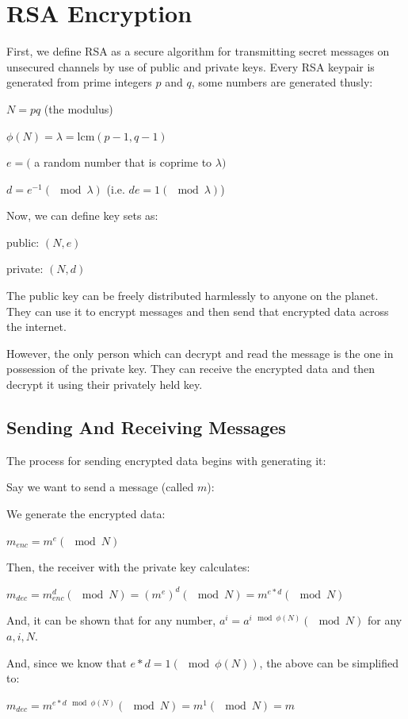 \documentclass[a4paper,11pt]{article}
\theoremstyle{mytheor}
\begin{document}
\section{RSA Encryption}\label{sec:rsa}

\cite{PCS} First, we define RSA as a secure algorithm for transmitting secret messages on unsecured channels by use of public and private keys. Every RSA keypair is generated from prime integers $p$ and $q$, some numbers are generated thusly:

$N=pq$ (the modulus)

$\phi(N) = \lambda = \mathrm{lcm}(p-1, q-1)$

$e = ($ a random number that is coprime to $\lambda)$

$d = e^{-1} (\mod \lambda)$ (i.e. $de = 1 (\mod \lambda)$)


Now, we can define key sets as:

public: $(N, e)$

private: $(N, d)$

The public key can be freely distributed harmlessly to anyone on the planet. They can use it to encrypt messages and then send that encrypted data across the internet.

However, the only person which can decrypt and read the message is the one in possession of the private key. They can receive the encrypted data and then decrypt it using their privately held key.

\subsection{Sending And Receiving Messages}

The process for sending encrypted data begins with generating it:

Say we want to send a message (called $m$):

We generate the encrypted data:

$m_{enc} = m ^ e (\mod N)$

Then, the receiver with the private key calculates:

$m_{dec} = m_{enc} ^ d (\mod N) = (m ^ e) ^ d (\mod N) = m ^ {e * d} (\mod N)$

And, it can be shown that for any number, $a^i = a^{i \mod \phi(N)} (\mod N)$ for any $a, i, N$.

And, since we know that $e * d = 1 (\mod \phi(N))$, the above can be simplified to:

$m_{dec} = m ^ {e * d \mod \phi(N)} (\mod N) = m ^ {1} (\mod N) = m$
\end{document}
